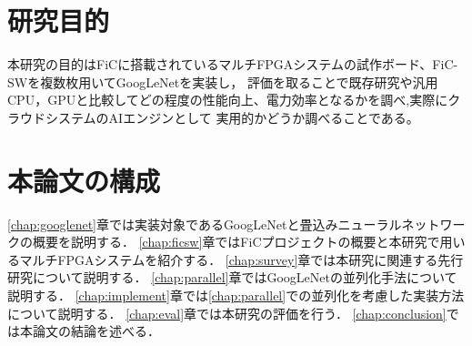 {    \section{研究目的}
    \label{sec:purpose}
    本研究の目的はFiCに搭載されているマルチFPGAシステムの試作ボード、FiC-SWを複数枚用いてGoogLeNetを実装し，
    評価を取ることで既存研究や汎用CPU，GPUと比較してどの程度の性能向上、電力効率となるかを調べ,実際にクラウドシステムのAIエンジンとして
    実用的かどうか調べることである。

    \section{本論文の構成}
    \label{sec:composition}
    \ref{chap:googlenet}章では実装対象であるGoogLeNetと畳込みニューラルネットワークの概要を説明する．
    \ref{chap:ficsw}章ではFiCプロジェクトの概要と本研究で用いるマルチFPGAシステムを紹介する．
    \ref{chap:survey}章では本研究に関連する先行研究について説明する．
    \ref{chap:parallel}章ではGoogLeNetの並列化手法について説明する．
    \ref{chap:implement}章では\ref{chap:parallel}での並列化を考慮した実装方法について説明する． 
    \ref{chap:eval}章では本研究の評価を行う． 
    \ref{chap:conclusion}では本論文の結論を述べる．
}
